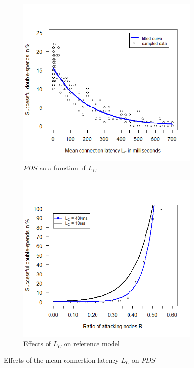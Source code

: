 \documentclass[a4paper,12pt,twoside]{report}
\begin{document}
\begin{figure}[h!]
\centering
\begin{subfigure}{.5\textwidth}
  \centering
  \includegraphics[width=\linewidth]{Experiments/ConnLatency/connection.png}
  \caption{$PDS$ as a function of $L_{C}$}
  \label{conn:a}
\end{subfigure}%
\begin{subfigure}{.5\textwidth}
  \centering
  \includegraphics[width=\linewidth]{Experiments/ConnLatency/conrat.png}
  \caption{Effects of $L_{C}$ on reference model}
  \label{conn:b}
\end{subfigure}
\caption{Effects of the mean connection latency $L_{C}$ on $PDS$}
\label{conn}
\end{figure}
\end{document}
